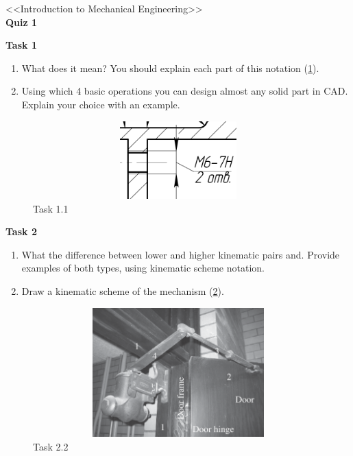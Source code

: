 \documentclass[12pt]{article}
\newcommand\pic[1]{(\cref{#1})} %
\begin{document}
\begin{center}
    \LARGE <<Introduction to Mechanical Engineering>> \\ \textbf{Quiz 1}
\end{center}

\textbf{Task 1}
\begin{enumerate}
    \item What does it mean? You should explain each part of this notation \pic{fig:resources_quiz_1/quiz1_task1.png}.
    \item Using which 4 basic operations you can design almost any solid part in CAD. Explain your choice with an example.
\end{enumerate}
\begin{figure}[H]
    \centering\includegraphics[height=3cm,width=1\textwidth,keepaspectratio]{resources_quiz_1/quiz1_task1.png}
    \caption{Task 1.1}
    \label{fig:resources_quiz_1/quiz1_task1.png}
\end{figure}

\textbf{Task 2}
\begin{enumerate}
    \item What the difference between lower and higher kinematic pairs and. Provide examples of both types, using kinematic scheme notation.
    \item Draw a kinematic scheme of the mechanism \pic{fig:resources_quiz_1/quiz1_task2.png}.
\end{enumerate}
\begin{figure}[H]
    \centering\includegraphics[height=5cm,width=1\textwidth,keepaspectratio]{resources_quiz_1/quiz1_task2.png}
    \caption{Task 2.2}
    \label{fig:resources_quiz_1/quiz1_task2.png}
\end{figure}
\end{document}
